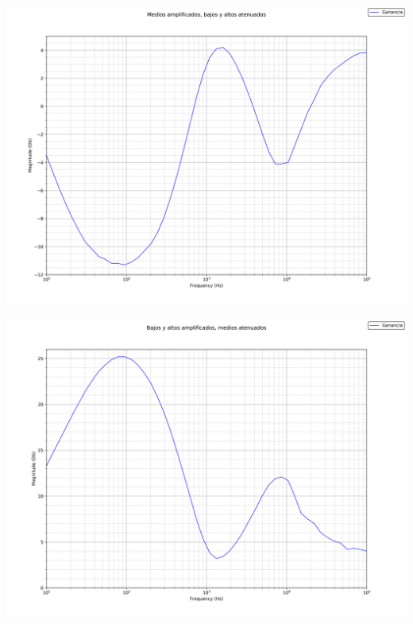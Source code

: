 \documentclass[a4paper,12pt,oneside,pdflatex,italian,final,twocolumn]{article}
\begin{document}
\begin{minipage}{0.47\textwidth}
  \includegraphics[width=\textwidth]{-B+M-A}
\end{minipage}
\hfill
\begin{minipage}{0.47\textwidth}
  \includegraphics[width=\textwidth]{+B-M+A}
\end{minipage}
\end{document}
